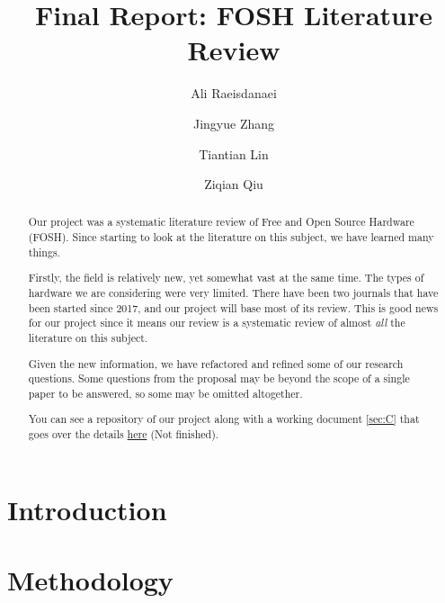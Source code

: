 \documentclass[acmtog]{acmart}
\begin{document}
\title{Final Report: FOSH Literature Review}

\author{Ali Raeisdanaei}

\author{Jingyue Zhang}

\author{Tiantian Lin}

\author{Ziqian Qiu}

\begin{abstract}
Our project was a systematic literature review of Free and Open Source Hardware (FOSH).
Since starting to look at the literature on this subject, we have learned many things. 

Firstly, the field is relatively new, yet somewhat vast at the same time. 
The types of hardware we are considering were very limited.
There have been two journals that have been started since 2017, and our project will base most of its review. 
This is good news for our project since it means our review is a systematic review of almost \textit{all} the literature on this subject. 

Given the new information, we have refactored and refined some of our research questions. 
Some questions from the proposal may be beyond the scope of a single paper to be answered, so some may be omitted altogether. 

You can see a repository of our project along with a working document \ref{sec:C} that goes over the details
\href{https://github.com/aliraeisdanaei/FOSH_Lit_Review/}{here}
(Not finished).
\end{abstract}


\maketitle

\section{Introduction}
\label{introduction}


\section{Methodology}
\label{methodology}

\end{document}
